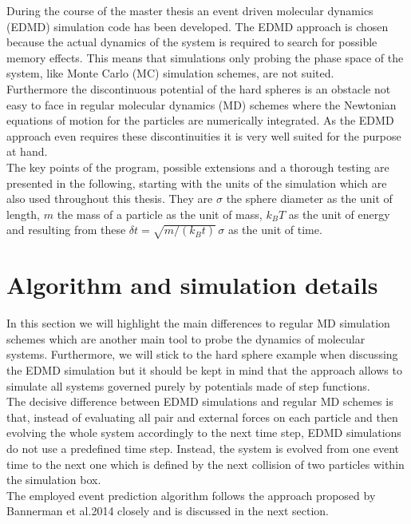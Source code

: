 
\label{chp:simulation}
During the course of the master thesis an event driven molecular dynamics (EDMD) simulation code has been developed. The EDMD approach is chosen because the actual dynamics of the system is required to search for possible memory effects. This means that simulations only probing the phase space of the system, like Monte Carlo (MC) simulation schemes, are not suited.\\ 
Furthermore the discontinuous potential of the hard spheres is an obstacle not easy to face in regular molecular dynamics (MD) schemes where the Newtonian equations of motion for the particles are numerically integrated. As the EDMD approach even requires these discontinuities it is very well suited for the purpose at hand.\\ 
The key points of the program, possible extensions and a thorough testing are presented in the following, starting with the units of the simulation which are also used throughout this thesis. They are $\sigma$ the sphere diameter as the unit of length, $m$ the mass of a particle as the unit of mass, $k_B T$ as the unit of energy and resulting from these $\delta t = \sqrt{m / (k_B t)} \, \sigma$ as the unit of time.

\section{Algorithm and simulation details}
\label{sec:simulation}
In this section we will highlight the main differences to regular MD simulation schemes which are another main tool to probe the dynamics of molecular systems. Furthermore, we will stick to the hard sphere example when discussing the EDMD simulation but it should be kept in mind that the approach allows to simulate all systems governed purely by potentials made of step functions.\\
 
The decisive difference between EDMD simulations and regular MD schemes is that, instead of evaluating all pair and external forces on each particle and then evolving the whole system accordingly to the next time step, EDMD simulations do not use a predefined time step. Instead, the system is evolved from one event time to the next one which is defined by the next collision of two particles within the simulation box.\\

The employed event prediction algorithm follows the approach proposed by Bannerman et al.2014\cite{Bannerman2014} closely and is discussed in the next section.

